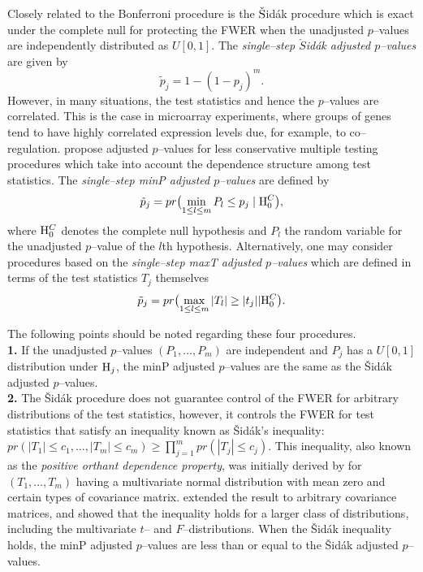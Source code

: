 \documentclass[11pt]{article}
\begin{document}
Closely related to the Bonferroni procedure is the $\check{\rm
  S}$id\'{a}k procedure which is exact under the complete null for protecting the FWER when the unadjusted $p$--values are independently distributed as $U[0,1]$. The {\it single--step $\check{S}$id\'{a}k adjusted $p$--values} are given by 
\begin{equation}\label{ess}
\tilde{p}_j = 1 - (1-p_j)^m.
\end{equation}
However, in many situations, the test statistics and hence the
$p$--values are correlated. This is the case in microarray experiments,
where groups of genes tend to have highly correlated expression levels
due, for example, to co--regulation. \cite{Westfall&Young93} propose adjusted $p$--values for less conservative multiple testing procedures which take into account the dependence structure among test statistics. The {\it single--step minP adjusted $p$--values} are defined by
\begin{equation}\label{eminPs}
 \tilde{p}_j = pr\bigl(\min_{1 \leq l \leq m} P_l \leq p_j \mid {\rm H}_0^C\bigr),
\end{equation}
where ${\rm H}_0^C$ denotes the complete null hypothesis and  $P_l$ 
the random variable for the unadjusted $p$--value of the $l$th hypothesis. Alternatively, one may consider procedures based on the {\it single--step maxT adjusted $p$--values} which are defined in terms of the test statistics $T_j$ themselves
\begin{equation}\label{emaxTs}
\tilde{p}_j = pr\bigl(\max_{1 \leq l \leq m} |T_l| \geq |t_j| | {\rm H}_0^C\bigr).
\end{equation}

The following points should be noted regarding these four procedures.\\

{\bf 1.} If the unadjusted $p$--values $(P_1, \ldots, P_m)$ are independent and $P_j$ has a $U[0,1]$ distribution under ${\rm H}_j$, the minP adjusted $p$--values are the same as the \v{S}id\'{a}k adjusted $p$--values. \\

{\bf 2.} The \v{S}id\'{a}k procedure does not guarantee control of the
FWER for arbitrary distributions of the test statistics, however, it
controls the FWER for test statistics that satisfy an inequality known
as \v{S}id\'{a}k's inequality: $pr(|T_1| \leq c_1, \ldots, |T_m| \leq
c_m) \geq \prod_{j=1}^m pr(|T_j| \leq c_j)$. This inequality, also
known as the {\it positive orthant dependence property}, was initially
derived by \cite{Dunn58} for $(T_1,\ldots,T_m)$ having a
multivariate normal distribution with mean zero and certain types of
covariance matrix. \cite{Sidak67} extended the result to
arbitrary covariance matrices, and \cite{Jogdeo77} showed that
the inequality holds for a larger class of distributions, including
the multivariate $t$-- and $F$--distributions. When the \v{S}id\'{a}k
inequality holds, the minP adjusted $p$--values are less than or equal
to the \v{S}id\'{a}k adjusted $p$--values.\\
\end{document}
